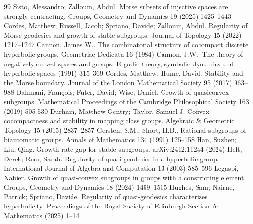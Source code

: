 \documentclass[10pt,a4paper]{amsart}
\begin{document}
\begin{thebibliography}{99}
 Sisto, Alessandro; Zalloum, Abdul. Morse subsets of injective spaces are strongly contracting. Groups, Geometry and Dynamics 19 (2025) 1425--1443
 Cordes, Matthew; Russell, Jacob; Spriano, Davide; Zalloum, Abdul. Regularity of {M}orse geodesics and growth of stable subgroups. Journal of Topology 15 (2022) 1217–1247
 Cannon, James W.. The combinatorial structure of cocompact discrete hyperbolic groups. Geometriae Dedicata 16 (1984)
 Cannon, J.W.. The theory of negatively curved spaces and groups. Ergodic theory, symbolic dynamics and hyperbolic spaces (1991) 315--369
 Cordes, Matthew; Hume, David. Stability and the {M}orse boundary. Journal of the London Mathematical Society 95 (2017) 963--988
 Dahmani, Fran\c{c}ois; Futer, David; Wise, Daniel. Growth of quasiconvex subgroups. Mathematical Proceedings of the Cambridge Philosophical Society 163 (2019) 505-530
 Durham, Matthew Gentry; Taylor, Samuel J. Convex cocompactness and stability in mapping class groups. Algebraic \& Geometric Topology 15 (2015) 2837--2857
 Gersten, S.M.; Short, H.B.. Rational subgroups of biautomatic groups. Annals of Mathematics 134 (1991) 125--158
 Han, Suzhen; Liu, Qing. Growth rate gap for stable subgroups. arXiv:2412.11244 (2024)
 Holt, Derek; Rees, Sarah. Regularity of quasi-geodesics in a hyperbolic group. International Journal of Algebra and Computation 13 (2003) 585--596
 Legaspi, Xabier. Growth of quasi-convex subgroups in groups with a constricting element. Groups, Geometry and Dynamics 18 (2024) 1469--1505
 Hughes, Sam; Nairne, Patrick; Spriano, Davide. Regularity of quasi-geodesics characterizes hyperbolicity. Proceedings of the Royal Society of Edinburgh Section A: Mathematics (2025) 1--14
\end{thebibliography}
\end{document}
